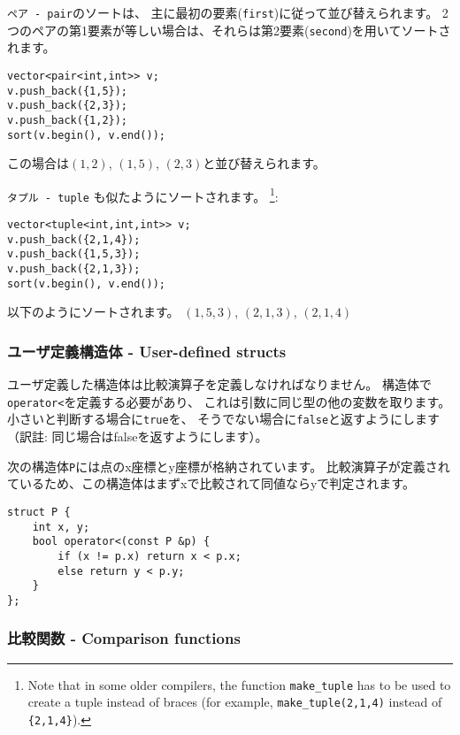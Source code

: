 \texttt{ペア - pair}のソートは、
主に最初の要素(\texttt{first})に従って並び替えられます。
2つのペアの第1要素が等しい場合は、それらは第2要素(\texttt{second})を用いてソートされます。

\begin{lstlisting}
vector<pair<int,int>> v;
v.push_back({1,5});
v.push_back({2,3});
v.push_back({1,2});
sort(v.begin(), v.end());
\end{lstlisting}
この場合は$(1,2)$, $(1,5)$, $(2,3)$と並び替えられます。


\texttt{タプル - tuple}
も似たようにソートされます。
\footnote{Note that in some older compilers,
the function \texttt{make\_tuple} has to be used to create a tuple instead of
braces (for example, \texttt{make\_tuple(2,1,4)} instead of \texttt{\{2,1,4\}}).}:
\begin{lstlisting}
vector<tuple<int,int,int>> v;
v.push_back({2,1,4});
v.push_back({1,5,3});
v.push_back({2,1,3});
sort(v.begin(), v.end());
\end{lstlisting}
以下のようにソートされます。
$(1,5,3)$, $(2,1,3)$, $(2,1,4)$

\subsubsection{ユーザ定義構造体 - User-defined structs}

ユーザ定義した構造体は比較演算子を定義しなければなりません。
構造体で
\texttt{operator<}を定義する必要があり、
これは引数に同じ型の他の変数を取ります。
小さいと判断する場合に\texttt{true}を、
そうでない場合に\texttt{false}と返すようにします（訳註: 同じ場合はfalseを返すようにします）。

次の構造体\texttt{P}には点のx座標とy座標が格納されています。
比較演算子が定義されているため、この構造体はまずxで比較されて同値ならyで判定されます。

\begin{lstlisting}
struct P {
    int x, y;
    bool operator<(const P &p) {
        if (x != p.x) return x < p.x;
        else return y < p.y;
    }
};
\end{lstlisting}

\subsubsection{比較関数 - Comparison functions}


